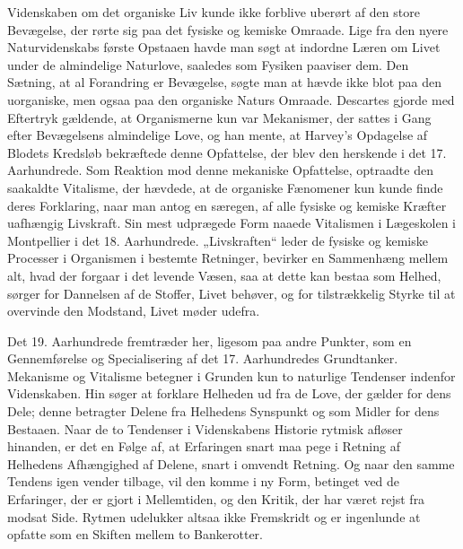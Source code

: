 \documentclass[12pt,a4paper,openany]{book}
\newcommand{\opage}[1]{\marginnote{\footnotesize\textit{[#1]}}}
\begin{document}
Videnskaben om det organiske Liv kunde ikke forblive uberørt
af den store Bevægelse, der rørte sig paa det fysiske og kemiske
Omraade. Lige fra den nyere Naturvidenskabs første Opstaaen havde
man søgt at indordne Læren om Livet under de almindelige Naturlove,
saaledes som Fysiken paaviser dem. Den Sætning, at al Forandring
er Bevægelse, søgte man at hævde ikke blot paa den uorganiske,
men ogsaa paa den organiske Naturs Omraade. Descartes
gjorde med Eftertryk gældende, at Organismerne kun var Mekanismer,
der sattes i Gang efter Bevægelsens almindelige Love, og han
mente, at Harvey’s Opdagelse af Blodets Kredsløb bekræftede denne
Opfattelse, der blev den herskende i det 17. Aarhundrede. Som Reaktion
mod denne mekaniske Opfattelse, optraadte den saakaldte
Vitalisme, der hævdede, at de organiske Fænomener kun kunde finde
deres Forklaring, naar man antog en særegen, af alle fysiske og kemiske
Kræfter uafhængig Livskraft. Sin mest udprægede Form
naaede Vitalismen i Lægeskolen i Montpellier i det 18. Aarhundrede.
„Livskraften“ leder de fysiske og kemiske Processer i Organismen i
bestemte Retninger, bevirker en Sammenhæng mellem alt, hvad der
forgaar i det levende Væsen, saa at dette kan bestaa som Helhed,
sørger for Dannelsen af de Stoffer, Livet behøver, og for tilstrækkelig
Styrke til at overvinde den Modstand, Livet møder udefra.

Det 19. Aarhundrede fremtræder her, ligesom paa andre Punkter,
som en Gennemførelse og Specialisering af det 17. Aarhundredes
Grundtanker. Mekanisme og Vitalisme betegner i Grunden kun to
\opage{33}naturlige Tendenser indenfor Videnskaben. Hin søger at forklare
Helheden ud fra de Love, der gælder for dens Dele; denne betragter
Delene fra Helhedens Synspunkt og som Midler for dens Bestaaen.
Naar de to Tendenser i Videnskabens Historie rytmisk afløser hinanden,
er det en Følge af, at Erfaringen snart maa pege i Retning
af Helhedens Afhængighed af Delene, snart i omvendt Retning. Og
naar den samme Tendens igen vender tilbage, vil den komme i ny
Form, betinget ved de Erfaringer, der er gjort i Mellemtiden, og
den Kritik, der har været rejst fra modsat Side. Rytmen udelukker
altsaa ikke Fremskridt og er ingenlunde at opfatte som en Skiften
mellem to Bankerotter.
\end{document}
